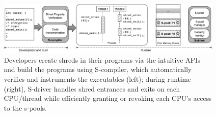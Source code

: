 \begin{figure}[t]
\begin{center}
\includegraphics[scale=0.45]{shreds/figures/arch}
\caption{Developers create shreds in their programs via the intuitive APIs and build the programs using S-compiler, which automatically verifies and instruments the executables (left); during runtime (right), S-driver handles shred entrances and exits on each CPU/thread while efficiently granting or revoking each CPU's access to the s-pools.}
\label{fig:overview}
\end{center}
\end{figure}
